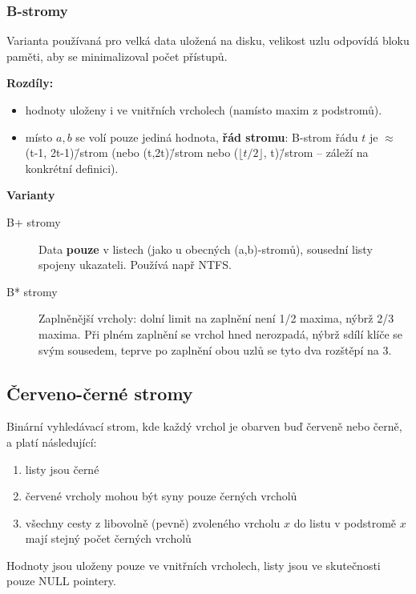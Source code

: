 \documentclass[11pt]{report} %
\numberwithin{equation}{section}
\begin{document}
\subsubsection{B-stromy}
Varianta používaná pro velká data uložená na disku, velikost uzlu odpovídá bloku paměti, aby se minimalizoval počet přístupů.

\textbf{Rozdíly: }
\begin{itemize}
	
	
	\item hodnoty uloženy i ve vnitřních vrcholech (namísto maxim z podstromů). 
	\item místo $a,b$ se volí pouze jediná hodnota, \textbf{řád stromu}: B-strom řádu $t$ je $\approx$ (t-1, 2t-1)\=/strom (nebo (t,2t)\=/strom nebo ($\lfloor t/2\rfloor$, t)\=/strom -- záleží na konkrétní definici).
\end{itemize}

\textbf{Varianty}
\begin{description}
	
	
	\item[B+ stromy] Data \textbf{pouze} v listech (jako u obecných (a,b)-stromů), sousední listy spojeny ukazateli. Používá např NTFS.
	
	\item[B* stromy] Zaplněnější vrcholy: dolní limit na zaplnění není 1/2 maxima, nýbrž 2/3 maxima. Při plném zaplnění se vrchol hned nerozpadá, nýbrž sdílí klíče se svým sousedem, teprve po zaplnění obou uzlů se tyto dva rozštěpí na 3.
\end{description}

\subsection{Červeno-černé stromy}
Binární vyhledávací strom, kde každý vrchol je obarven buď červeně nebo černě, a platí následující:
\begin{enumerate}
		
	
	\item listy jsou černé
	\item červené vrcholy mohou být syny pouze černých vrcholů
	\item všechny cesty z libovolně (pevně) zvoleného vrcholu $x$ do listu v podstromě $x$ mají stejný počet černých vrcholů
\end{enumerate}

Hodnoty jsou uloženy pouze ve vnitřních vrcholech, listy jsou ve skutečnosti pouze NULL pointery.
\end{document}

